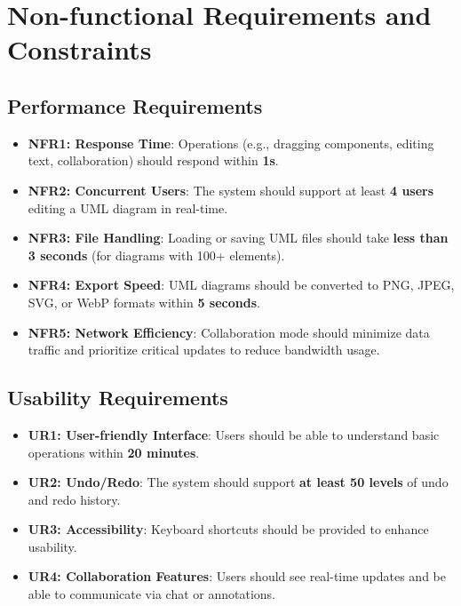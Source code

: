 \documentclass[12pt]{article}
\begin{document}




    \section{Non-functional Requirements and Constraints}

    \subsection{Performance Requirements}
    \begin{itemize}
        \item \textbf{NFR1: Response Time}: Operations (e.g., dragging components, editing text, collaboration) should respond within \textbf{1s}.
        \item \textbf{NFR2: Concurrent Users}: The system should support at least \textbf{4 users} editing a UML diagram in real-time.
        \item \textbf{NFR3: File Handling}: Loading or saving UML files should take \textbf{less than 3 seconds} (for diagrams with 100+ elements).
        \item \textbf{NFR4: Export Speed}: UML diagrams should be converted to PNG, JPEG, SVG, or WebP formats within \textbf{5 seconds}.
        \item \textbf{NFR5: Network Efficiency}: Collaboration mode should minimize data traffic and prioritize critical updates to reduce bandwidth usage.
    \end{itemize}

    \subsection{Usability Requirements}
    \begin{itemize}
        \item \textbf{UR1: User-friendly Interface}: Users should be able to understand basic operations within \textbf{20 minutes}.
        \item \textbf{UR2: Undo/Redo}: The system should support \textbf{at least 50 levels} of undo and redo history.
        \item \textbf{UR3: Accessibility}: Keyboard shortcuts should be provided to enhance usability.
        \item \textbf{UR4: Collaboration Features}: Users should see real-time updates and be able to communicate via chat or annotations.
    \end{itemize}
\end{document}
